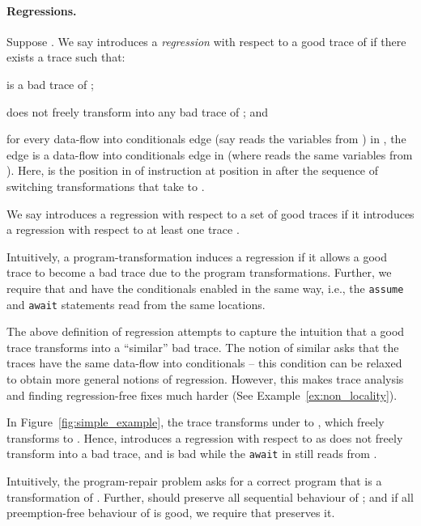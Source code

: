 \documentclass{llncs}
\begin{document}
\paragraph{Regressions.}
Suppose .
We say  introduces a {\em
regression} with respect to a good trace  of  if there exists a trace  such that:
\begin{inparaenum}[(a)]
\item  is a bad trace of ;
\item  does not freely transform into any bad trace of ; and
\item for every data-flow into conditionals edge  (say 
  reads the variables  from ) in , the edge  is a data-flow into conditionals edge in  (where
   reads the same variables  from ).
  Here,  is the position in  of instruction at position
   in  after the sequence of switching transformations that
  take  to .
\end{inparaenum}
We say  introduces a regression with respect
to a set  of good traces if it introduces a
regression with respect to at least one trace .

Intuitively, a program-transformation induces a regression if it allows
a good trace  to become a bad trace  due to the program
transformations.
Further, we require that  and  have the conditionals
enabled in the same way, i.e., the {\tt assume} and {\tt await}
statements read from the same locations.
\begin{remark}
  \label{rem:regressions}
  The above definition of regression attempts to capture the intuition
  that a good trace transforms into a ``similar'' bad trace.
  The notion of similar asks that the traces have the same data-flow
  into conditionals -- this condition can be relaxed to obtain more
  general notions of regression.
  However, this makes trace analysis and finding regression-free fixes
  much harder (See Example~\ref{ex:non_locality}).
\end{remark}

\begin{example}
  In Figure~\ref{fig:simple_example}, the trace  transforms under  to , which freely transforms to .
  Hence,  introduces a regression with respect to 
  as  does not freely transform into a bad trace,
  and  is bad while the {\tt await} in  still reads from .
\end{example}

Intuitively, the program-repair problem asks for a correct program
 that is a transformation of .
Further,  should preserve all sequential behaviour
of ; and if all preemption-free behaviour of  is good, we
require that  preserves it.
\end{document}
